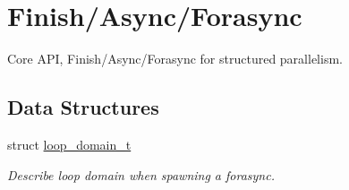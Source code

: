 \hypertarget{group__HClib}{\section{Finish/\-Async/\-Forasync}
\label{group__HClib}
}


Core A\-P\-I, Finish/\-Async/\-Forasync for structured parallelism.  


\subsection*{Data Structures}
\begin{DoxyCompactItemize}
\item 
struct \hyperlink{structloop__domain__t}{loop\-\_\-domain\-\_\-t}
\begin{DoxyCompactList}\small\item\em Describe loop domain when spawning a forasync. \end{DoxyCompactList}\end{DoxyCompactItemize}
